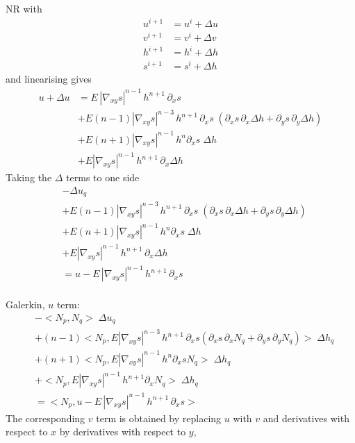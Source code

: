 \documentclass[10pt,a4paper]{book}
\newcommand{\p}{\partial}
\begin{document}
NR with 
\begin{align*}                  
 u^{i+1}&=u^i+\Delta u\\ 
 v^{i+1}&=v^i+\Delta v\\ 
 h^{i+1}&=h^i+\Delta h\\ 
 s^{i+1}&=s^i+\Delta h
\end{align*}
and linearising gives
\begin{align*}
u+\Delta u & = E \, | \nabla_{xy} s|^{n-1} \, h^{n+1} \, \p_x s \\
            &+  E (n-1) | \nabla_{xy} s|^{n-3} \, h^{n+1} \, \p_x s \; (\p_x s \, \p_x \Delta h + \p_ys \, \p_y \Delta h)    \\
            &+E (n+1) | \nabla_{xy} s|^{n-1} \, h^n \p_x s \; \Delta h \\
            &+E | \nabla_{xy} s|^{n-1} \, h^{n+1} \, \p_x \Delta h 
\end{align*}
Taking the $\Delta$ terms to one side 
\begin{align*}
            &-\Delta u_q  \\
            &+E (n-1) | \nabla_{xy} s|^{n-3} \, h^{n+1} \, \p_x s \; (\p_x s \, \p_x \Delta h + \p_ys \, \p_y \Delta h)    \\
            &+E (n+1) | \nabla_{xy} s|^{n-1} \, h^n \p_x s \; \Delta h \\
            &+E | \nabla_{xy} s|^{n-1} \, h^{n+1} \, \p_x  \Delta h \\
            &= u- E \, | \nabla_{xy} s|^{n-1} \, h^{n+1} \, \p_x s \\
 \end{align*}



Galerkin, $u$ term:
\begin{align*}
            &-<N_p,  N_q > \; \Delta u_q  \\
            &+ (n-1) < N_p , E | \nabla_{xy} s|^{n-3} \,  h^{n+1} \, \p_x s (\p_x s \, \p_x N_q + \p_ys \, \p_y N_q)> \; \Delta h_q   \\
            &+ (n+1) < N_p , E | \nabla_{xy} s|^{n-1} \, h^n \p_x s  N_q  > \; \Delta h_q \\
            &+ < N_p , E | \nabla_{xy} s|^{n-1} \, h^{n+1}  \p_x N_q > \; \Delta h_q \\
            &= < N_p,  u- E \, | \nabla_{xy} s|^{n-1} \, h^{n+1} \, \p_x s >
 \end{align*}
The corresponding $v$ term is obtained by replacing $u$ with $v$ and derivatives with respect to $x$ by derivatives with
respect to $y$,
\end{document}
